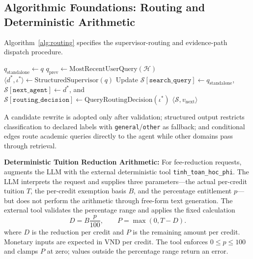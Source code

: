 \subsection{Algorithmic Foundations: Routing and Deterministic Arithmetic}
\label{sec:algorithms}

Algorithm~\ref{alg:routing} specifies the supervisor-routing and evidence-path dispatch procedure.

\begin{algorithm}[!htbp]
\footnotesize
\SetAlFnt{\footnotesize}
\SetAlCapFnt{\footnotesize}
\SetAlCapNameFnt{\footnotesize}
\SetAlgoVlined
\LinesNumbered
\caption{Supervisor Routing and Conditional Evidence-Path Dispatch}
\label{alg:routing}
$q_{\text{standalone}} \leftarrow q$\;
$q_{\mathrm{prev}} \leftarrow \mathrm{MostRecentUserQuery}(\mathcal{H})$\;
$\langle d^*, \iota^* \rangle \leftarrow \mathrm{StructuredSupervisor}(q)$\;
Update $\mathcal{S}[\texttt{search\_query}] \leftarrow q_{\text{standalone}}$, $\mathcal{S}[\texttt{next\_agent}] \leftarrow d^*$, and $\mathcal{S}[\texttt{routing\_decision}] \leftarrow \mathrm{QueryRoutingDecision}(\iota^*)$\;
\Return $\langle \mathcal{S}, v_{\text{next}} \rangle$\;
\end{algorithm}

A candidate rewrite is adopted only after validation; structured output restricts classification to declared labels with \texttt{general}/\texttt{other} as fallback; and conditional edges route academic queries directly to the agent while other domains pass through retrieval.

\textbf{Deterministic Tuition Reduction Arithmetic:}
For fee-reduction requests, \system{} augments the LLM with the external deterministic tool \texttt{tinh\_toan\_hoc\_phi}. The LLM interprets the request and supplies three parameters---the actual per-credit tuition $T$, the per-credit exemption basis $B$, and the percentage entitlement $p$---but does not perform the arithmetic through free-form text generation. The external tool validates the percentage range and applies the fixed calculation
\begin{equation}
  D = B\frac{p}{100}, \qquad P = \max(0, T-D).
  \label{eq:tuition_reduction}
\end{equation}
where $D$ is the reduction per credit and $P$ is the remaining amount per credit. Monetary inputs are expected in VND per credit. The tool enforces $0 \le p \le 100$ and clamps $P$ at zero; values outside the percentage range return an error.

